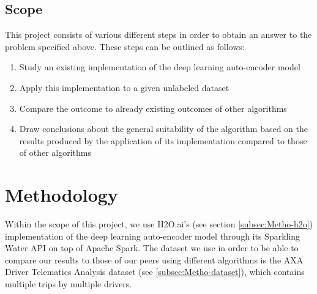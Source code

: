 \documentclass{vldb}
\begin{document}
\subsection{Scope}\label{ssec:scope}
This project consists of various different steps in order to obtain an answer to the problem specified above.
These steps can be outlined as follows:
\begin{enumerate}
	\item Study an existing implementation of the deep learning auto-encoder model
	\item Apply this implementation to a given unlabeled dataset
	\item Compare the outcome to already existing outcomes of other algorithms
	\item Draw conclusions about the general suitability of the algorithm based on the results produced by the application of its implementation compared to those of other algorithms
\end{enumerate}

\section{Methodology}
Within the scope of this project, we use H2O.ai's (see section \ref{subsec:Metho-h2o}) implementation of the deep learning auto-encoder model through its Sparkling Water API on top of Apache Spark. The dataset we use in order to be able to compare our results to those of our peers using different algorithms is the AXA Driver Telematics Analysis dataset (see \ref{subsec:Metho-dataset}), which contains multiple trips by multiple drivers. 
\end{document}
